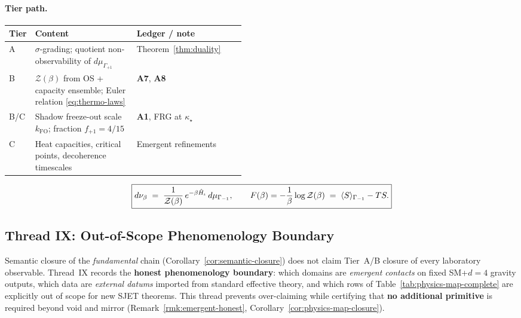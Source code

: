 \paragraph{Tier path.}
\begin{center}
\small
\renewcommand{\arraystretch}{1.1}
\begin{tabular}{@{}llp{0.46\linewidth}@{}}
\toprule
\textbf{Tier} & \textbf{Content} & \textbf{Ledger / note} \\
\midrule
A &
  $\sigma$-grading; quotient non-observability of $d\mu_{\Gamma_{+1}}$ &
  Theorem~\ref{thm:duality} \\
B &
  $\mathcal{Z}(\beta)$ from OS + capacity ensemble;
  Euler relation \eqref{eq:thermo-laws} &
  \textbf{A7}, \textbf{A8} \\
B/C &
  Shadow freeze-out scale $k_{\mathrm{FO}}$; fraction $f_{+1}=4/15$ &
  \textbf{A1}, FRG at $\kappa_\star$ \\
C &
  Heat capacities, critical points, decoherence timescales &
  Emergent refinements \\
\bottomrule
\end{tabular}
\end{center}

\begin{equation}\label{eq:thread-8-box}
  \boxed{%
  d\nu_\beta
  \;=\;
  \frac{1}{\mathcal{Z}(\beta)}\,
  e^{-\beta\hat H_\iota}\,
  d\mu_{\Gamma_{-1}},
  \qquad
  F(\beta)=-\frac{1}{\beta}\log\mathcal{Z}(\beta)
  \;=\;
  \langle S\rangle_{\Gamma_{-1}}-TS.}
\end{equation}

\subsection{Thread IX: Out-of-Scope Phenomenology Boundary}
\label{sec:thread-9}

Semantic closure of the \emph{fundamental} chain
(Corollary~\ref{cor:semantic-closure}) does not claim Tier~A/B closure of every
laboratory observable. Thread~IX records the \textbf{honest phenomenology
boundary}: which domains are \emph{emergent contacts} on fixed SM+$d{=}4$
gravity outputs, which data are \emph{external datums} imported from standard
effective theory, and which rows of Table~\ref{tab:physics-map-complete} are
explicitly out of scope for new SJET theorems. This thread prevents
over-claiming while certifying that \textbf{no additional primitive} is required
beyond void and mirror (Remark~\ref{rmk:emergent-honest},
Corollary~\ref{cor:physics-map-closure}).

